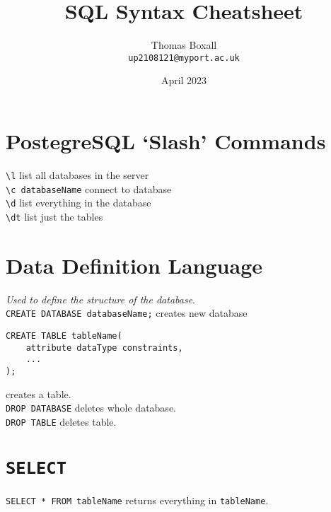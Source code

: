 \documentclass[a4paper,11pt, twocolumn]{article}
\title{SQL Syntax Cheatsheet}
\author{Thomas Boxall\\ \texttt{up2108121@myport.ac.uk}}
\date{April 2023}
\begin{document}
\maketitle
\thispagestyle{fancy}

\section{PostegreSQL `Slash' Commands}
\verb|\l| list all databases in the server\\
\verb|\c databaseName| connect to database\\
\verb|\d| list everything in the database\\
\verb|\dt| list just the tables\\

\section{Data Definition Language}
\textit{Used to define the structure of the database}.\\
\verb|CREATE DATABASE databaseName;| creates new database
\begin{verbatim}
CREATE TABLE tableName(
    attribute dataType constraints,
    ...
);
\end{verbatim}
creates a table.\\
\verb|DROP DATABASE| deletes whole database.\\
\verb|DROP TABLE| deletes table.


\section{\texttt{SELECT}}
\verb|SELECT * FROM tableName| returns everything in \verb|tableName|.
\end{document}
